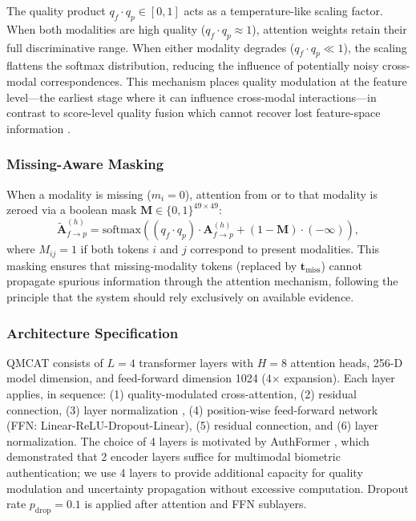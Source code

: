 \documentclass[10pt,journal,compsoc]{IEEEtran}
\begin{document}
The quality product $q_f \cdot q_p \in [0, 1]$ acts as a temperature-like scaling factor. When both modalities are high quality ($q_f \cdot q_p \approx 1$), attention weights retain their full discriminative range. When either modality degrades ($q_f \cdot q_p \ll 1$), the scaling flattens the softmax distribution, reducing the influence of potentially noisy cross-modal correspondences. This mechanism places quality modulation at the feature level---the earliest stage where it can influence cross-modal interactions---in contrast to score-level quality fusion which cannot recover lost feature-space information \cite{soleymani2021quality, liang2024deep}.

\subsubsection{Missing-Aware Masking}

When a modality is missing ($m_i = 0$), attention from or to that modality is zeroed via a boolean mask $\mathbf{M} \in \{0, 1\}^{49 \times 49}$:
\begin{equation}
\label{eq:missing_mask}
\tilde{\mathbf{A}}_{f \rightarrow p}^{(h)} = \text{softmax}\left( (q_f \cdot q_p) \cdot \mathbf{A}_{f \rightarrow p}^{(h)} + (1 - \mathbf{M}) \cdot (-\infty) \right),
\end{equation}
where $M_{ij} = 1$ if both tokens $i$ and $j$ correspond to present modalities. This masking ensures that missing-modality tokens (replaced by $\mathbf{t}_{\text{miss}}$) cannot propagate spurious information through the attention mechanism, following the principle that the system should rely exclusively on available evidence.

\subsubsection{Architecture Specification}

QMCAT consists of $L = 4$ transformer layers with $H = 8$ attention heads, 256-D model dimension, and feed-forward dimension 1024 (4$\times$ expansion). Each layer applies, in sequence: (1) quality-modulated cross-attention, (2) residual connection, (3) layer normalization \cite{ba2016layer}, (4) position-wise feed-forward network (FFN: Linear-ReLU-Dropout-Linear), (5) residual connection, and (6) layer normalization. The choice of 4 layers is motivated by AuthFormer \cite{yang2024authformer}, which demonstrated that 2 encoder layers suffice for multimodal biometric authentication; we use 4 layers to provide additional capacity for quality modulation and uncertainty propagation without excessive computation. Dropout rate $p_{\text{drop}} = 0.1$ is applied after attention and FFN sublayers.
\end{document}
